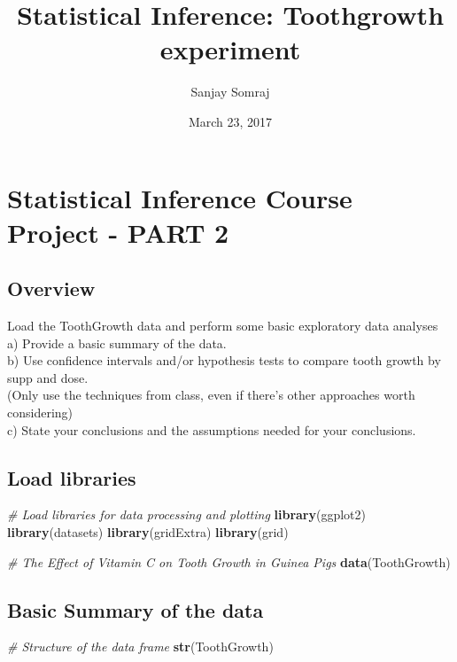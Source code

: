\documentclass[]{article}
\title{Statistical Inference: Toothgrowth experiment}
\author{Sanjay Somraj}
\date{March 23, 2017}
\newenvironment{Shaded}{\begin{snugshade}}{\end{snugshade}}
\newcommand{\KeywordTok}[1]{\textcolor[rgb]{0.13,0.29,0.53}{\textbf{{#1}}}}
\newcommand{\CommentTok}[1]{\textcolor[rgb]{0.56,0.35,0.01}{\textit{{#1}}}}
\newcommand{\NormalTok}[1]{{#1}}
\begin{document}
\maketitle

\section{Statistical Inference Course Project - PART
2}\label{statistical-inference-course-project---part-2}

\subsection{Overview}\label{overview}

Load the ToothGrowth data and perform some basic exploratory data
analyses\\
a) Provide a basic summary of the data.\\
b) Use confidence intervals and/or hypothesis tests to compare tooth
growth by supp and dose.\\
(Only use the techniques from class, even if there's other approaches
worth considering)\\
c) State your conclusions and the assumptions needed for your
conclusions.

\subsection{Load libraries}\label{load-libraries}

\begin{Shaded}
\begin{Highlighting}[]
\CommentTok{# Load libraries for data processing and plotting}
\KeywordTok{library}\NormalTok{(ggplot2)}
\KeywordTok{library}\NormalTok{(datasets)}
\KeywordTok{library}\NormalTok{(gridExtra)}
\KeywordTok{library}\NormalTok{(grid)}

\CommentTok{# The Effect of Vitamin C on Tooth Growth in Guinea Pigs}
\KeywordTok{data}\NormalTok{(ToothGrowth)}
\end{Highlighting}
\end{Shaded}

\subsection{Basic Summary of the data}\label{basic-summary-of-the-data}

\begin{Shaded}
\begin{Highlighting}[]
\CommentTok{# Structure of the data frame}
\KeywordTok{str}\NormalTok{(ToothGrowth)}
\end{Highlighting}
\end{Shaded}
\end{document}
